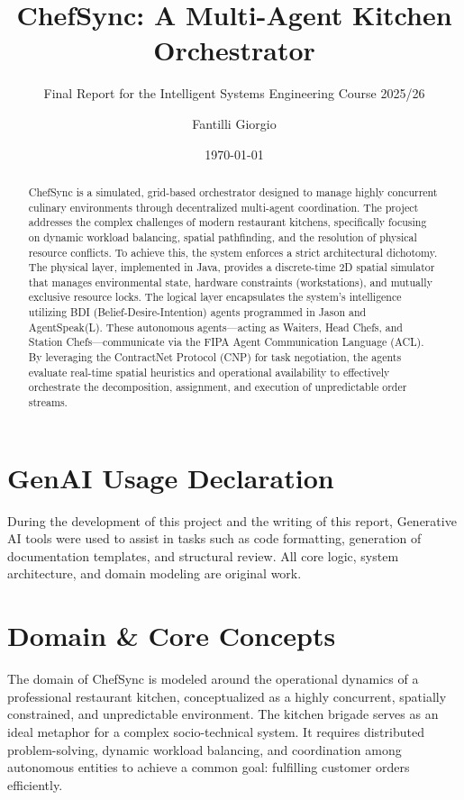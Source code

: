 \documentclass{scrartcl}
\title{\LARGE
    ChefSync: A Multi-Agent Kitchen Orchestrator
}
\subtitle{Final Report for the Intelligent Systems Engineering Course 2025/26}
\author{
    Fantilli Giorgio \\ \emailaddr{giorgio.fantilli@studio.unibo.it}
}
\date{\today}
\begin{document}
\maketitle

\begin{abstract}
ChefSync is a simulated, grid-based orchestrator designed to manage highly concurrent culinary environments through decentralized multi-agent coordination. The project addresses the complex challenges of modern restaurant kitchens, specifically focusing on dynamic workload balancing, spatial pathfinding, and the resolution of physical resource conflicts. To achieve this, the system enforces a strict architectural dichotomy. The physical layer, implemented in Java, provides a discrete-time 2D spatial simulator that manages environmental state, hardware constraints (workstations), and mutually exclusive resource locks. The logical layer encapsulates the system's intelligence utilizing BDI (Belief-Desire-Intention) agents programmed in Jason and AgentSpeak(L). These autonomous agents---acting as Waiters, Head Chefs, and Station Chefs---communicate via the FIPA Agent Communication Language (ACL). By leveraging the ContractNet Protocol (CNP) for task negotiation, the agents evaluate real-time spatial heuristics and operational availability to effectively orchestrate the decomposition, assignment, and execution of unpredictable order streams.
\end{abstract}

\section*{GenAI Usage Declaration}
During the development of this project and the writing of this report, Generative AI tools were used to assist in tasks such as code formatting, generation of documentation templates, and structural review. All core logic, system architecture, and domain modeling are original work.

\newpage
\tableofcontents
\newpage



\section{Domain \& Core Concepts}

The domain of ChefSync is modeled around the operational dynamics of a professional restaurant kitchen, conceptualized as a highly concurrent, spatially constrained, and unpredictable environment. The kitchen brigade serves as an ideal metaphor for a complex socio-technical system. It requires distributed problem-solving, dynamic workload balancing, and coordination among autonomous entities to achieve a common goal: fulfilling customer orders efficiently.
\end{document}
